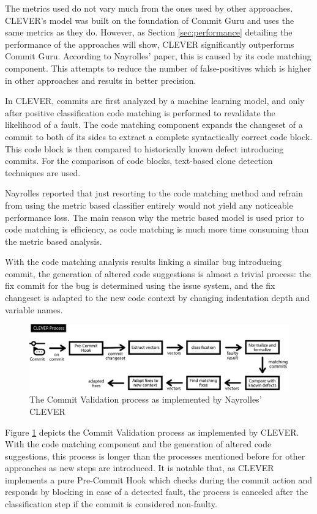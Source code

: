 The metrics used do not vary much from the ones used by other approaches. CLEVER's model was built on the foundation of Commit Guru and uses the same metrics as they do. However, as Section \ref{sec:performance} detailing the performance of the approaches will show, CLEVER significantly outperforms Commit Guru. According to Nayrolles' paper, this is caused by its code matching component. This attempts to reduce the number of false-positives which is higher in other approaches and results in better precision.

In CLEVER, commits are first analyzed by a machine learning model, and only after positive classification code matching is performed to revalidate the likelihood of a fault. The code matching component expands the changeset of a commit to both of its sides to extract a complete syntactically correct code block. This code block is then compared to historically known defect introducing commits. For the comparison of code blocks, text-based clone detection techniques are used.

Nayrolles reported that just resorting to the code matching method and refrain from using the metric based classifier entirely would not yield any noticeable performance loss. The main reason why the metric based model is used prior to code matching is efficiency, as code matching is much more time consuming than the metric based analysis.

With the code matching analysis results linking a similar bug introducing commit, the generation of altered code suggestions is almost a trivial process: the fix commit for the bug is determined using the issue system, and the fix changeset is adapted to the new code context by changing indentation depth and variable names.

\begin{figure}[t]
	\centering
	\includegraphics[width=\textwidth]{images/commitvalidation-process/cleverprocess-pdf}
	\caption{The Commit Validation process as implemented by Nayrolles' CLEVER \cite{Nayrolles2018}}
	\label{fig:cvprocess-clever}
\end{figure}

Figure \ref{fig:cvprocess-clever} depicts the Commit Validation process as implemented by CLEVER. With the code matching component and the generation of altered code suggestions, this process is longer than the processes mentioned before for other approaches as new steps are introduced. It is notable that, as CLEVER implements a pure Pre-Commit Hook which checks during the commit action and responds by blocking in case of a detected fault, the process is canceled after the classification step if the commit is considered non-faulty.

